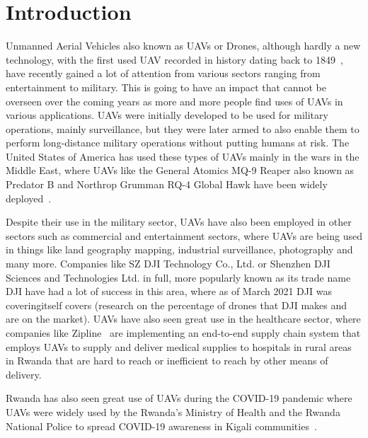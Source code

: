 
\chapter{Introduction}
\label{cha:thesis-introduction}

Unmanned Aerial Vehicles also known as UAVs or Drones, although hardly a new technology, with the first used UAV recorded in history dating back to 1849~\cite{vasileprisacariujdrm2017}, have recently gained a lot of attention from various sectors ranging from entertainment to military. This is going to have an impact that cannot be overseen over the coming years as more and more people find uses of UAVs in various applications. UAVs were initially developed to be used for military operations, mainly surveillance, but they were later armed to also enable them to perform long-distance military operations without putting humans at risk. The United States of America has used these types of UAVs mainly in the wars in the Middle East, where UAVs like the General Atomics MQ-9 Reaper also known as Predator B and Northrop Grumman RQ-4 Global Hawk have been widely deployed~\cite{samaanorientxxi2022}.

Despite their use in the military sector, UAVs have also been employed in other sectors such as commercial and entertainment sectors, where UAVs are being used in things like land geography mapping, industrial surveillance, photography and many more. Companies like SZ DJI Technology Co., Ltd. or Shenzhen DJI Sciences and Technologies Ltd. in full, more popularly known as its trade name DJI have had a lot of success in this area, where as of March 2021 DJI was coveringitself covers (research on the percentage of drones that DJI makes and are on the market). UAVs have also seen great use in the healthcare sector, where companies like Zipline~\cite{droneslevy2022} are implementing an end-to-end supply chain system that employs UAVs to supply and deliver medical supplies to hospitals in rural areas in Rwanda that are hard to reach or inefficient to reach by other means of delivery.

Rwanda has also seen great use of UAVs during the COVID-19 pandemic where UAVs were widely used by the Rwanda’s Ministry of Health and the Rwanda National Police to spread COVID-19 awareness in Kigali communities~\cite{whoafricarw2020}.

